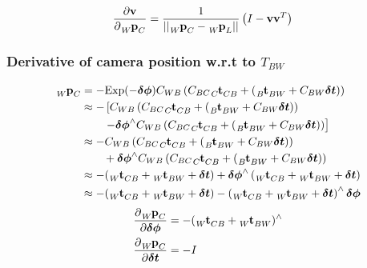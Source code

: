 \documentclass[10pt,a4paper]{article}
\numberwithin{equation}{section}
\renewcommand{\vec}[1]{\ensuremath{\mathbf{#1}}}
\newcommand{\vecs}[1]{\ensuremath{\boldsymbol{#1}}}
\newcommand{\norm}[1]{\ensuremath{\left|\left|#1\right|\right|}}
\newcommand{\Exp}{\mathrm{Exp}}
\begin{document}
\begin{align}
\frac{\partial \vec{v}}{\partial\tensor[_W]{\vec{p}}{_C}} &= 
\frac{1}{\norm{\tensor[_W]{\vec{p}}{_C} - \tensor[_W]{\vec{p}}{_L}}}
\left(
I - \vec{v}\vec{v}^T
\right)
\end{align}
\subsubsection{Derivative of camera position w.r.t to $T_{BW}$}
\begin{align}
\tensor[_W]{\vec{p}}{_C} &= -\Exp(-\vecs{\delta\phi}) C_{WB} \left( C_{BC} \tensor[_C]{\vec{t}}{_{CB}} + \left(\tensor[_B]{\vec{t}}{_{BW}} + C_{BW} \vecs{\delta t}\right)\right)\\
&\approx -\left[C_{WB} \left( C_{BC} \tensor[_C]{\vec{t}}{_{CB}} + \left(\tensor[_B]{\vec{t}}{_{BW}} + C_{BW} \vecs{\delta t}\right)\right)\right.\\
&\left.\qquad-\vecs{\delta\phi}^\wedge C_{WB} \left( C_{BC} \tensor[_C]{\vec{t}}{_{CB}} + \left(\tensor[_B]{\vec{t}}{_{BW}} + C_{BW} \vecs{\delta t}\right)\right)\right]\\
&\approx -C_{WB} \left( C_{BC} \tensor[_C]{\vec{t}}{_{CB}} + \left(\tensor[_B]{\vec{t}}{_{BW}} + C_{BW} \vecs{\delta t}\right)\right)\\
&\qquad+\vecs{\delta\phi}^\wedge C_{WB} \left( C_{BC} \tensor[_C]{\vec{t}}{_{CB}} + \left(\tensor[_B]{\vec{t}}{_{BW}} + C_{BW} \vecs{\delta t}\right)\right)\\
%
&\approx -(\tensor[_W]{\vec{t}}{_{CB}} + \tensor[_W]{\vec{t}}{_{BW}} + \vecs{\delta t})
+ \vecs{\delta\phi}^\wedge\left(\tensor[_W]{\vec{t}}{_{CB}} + \tensor[_W]{\vec{t}}{_{BW}} + \vecs{\delta t}\right)\\
&\approx -(\tensor[_W]{\vec{t}}{_{CB}} + \tensor[_W]{\vec{t}}{_{BW}} + \vecs{\delta t})
- \left(\tensor[_W]{\vec{t}}{_{CB}} + \tensor[_W]{\vec{t}}{_{BW}} + \vecs{\delta t}\right)^\wedge\vecs{\delta\phi}\\
%
\end{align}
\begin{align}
\frac{\partial\tensor[_W]{\vec{p}}{_C}}{\partial\vecs{\delta\phi}} &= -(\tensor[_W]{\vec{t}}{_{CB}} + \tensor[_W]{\vec{t}}{_{BW}})^\wedge\\
\frac{\partial\tensor[_W]{\vec{p}}{_C}}{\partial\vecs{\delta t}} &= -I
\end{align}
\end{document}

